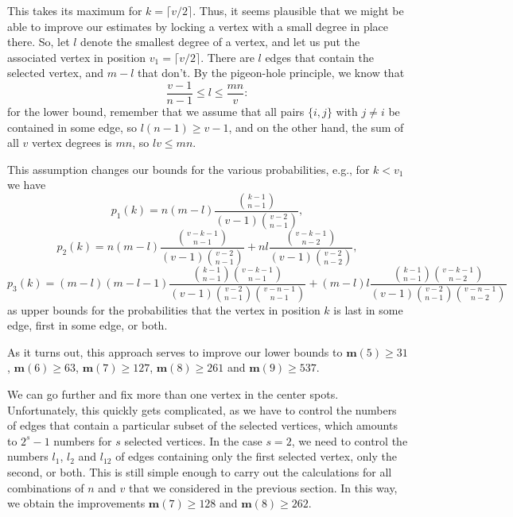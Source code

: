 \documentclass[a4paper,12pt]{article}
\begin{document}
This takes its maximum for $k=\lceil v/2\rceil$. Thus, it seems plausible
that we might be able to improve our estimates by locking a vertex with a
small degree in place there. So, let $l$ denote the smallest degree
of a vertex, and let us put the associated vertex in position
$v_1=\lceil v/2\rceil$. There are $l$ edges that contain the selected
vertex, and $m-l$ that don't. By the pigeon-hole principle, we know
that
\[\frac{v-1}{n-1}\le l\le \frac{mn}{v}:\]
for the lower bound, remember that we assume that all pairs $\{i,j\}$ with
$j\neq i$ be contained in some edge, so $l(n-1)\ge v-1$, and on the other
hand, the sum of all $v$ vertex degrees is $mn$, so $lv\le mn$.

This assumption changes our bounds for the various probabilities, e.g.,
for $k<v_1$ we have
\[p_1(k)=n(m-l)\frac{\genfrac(){0pt}1{k-1}{n-1}}
{(v-1)\genfrac(){0pt}1{v-2}{n-1}},\]
\[p_2(k)=n(m-l)\frac{\genfrac(){0pt}1{v-k-1}{n-1}}
{(v-1)\genfrac(){0pt}1{v-2}{n-1}}+
nl\frac{\genfrac(){0pt}1{v-k-1}{n-2}}
{(v-1)\genfrac(){0pt}1{v-2}{n-2}},\]
\[p_3(k)=(m-l)(m-l-1)\frac{
\genfrac(){0pt}1{k-1}{n-1}\genfrac(){0pt}1{v-k-1}{n-1}}
{(v-1)\genfrac(){0pt}1{v-2}{n-1}\genfrac(){0pt}1{v-n-1}{n-1}}+
(m-l)l\frac{
\genfrac(){0pt}1{k-1}{n-1}\genfrac(){0pt}1{v-k-1}{n-2}}
{(v-1)\genfrac(){0pt}1{v-2}{n-1}\genfrac(){0pt}1{v-n-1}{n-2}}\]
as upper bounds for the probabilities that the vertex in position $k$ is
last in some edge, first in some edge, or both.

As it turns out, this approach serves to improve our lower bounds to
$\mathbf m(5)\ge 31$, $\mathbf m(6)\ge 63$, $\mathbf m(7)\ge 127$, $\mathbf m(8)\ge 261$ and
$\mathbf m(9)\ge 537$.

We can go further and fix more than one vertex in the center spots.
 Unfortunately, this quickly gets complicated, as we have
to control the numbers of edges that contain a particular subset of the
selected vertices, which amounts to $2^s-1$ numbers for $s$ selected 
vertices. In the case $s=2$, we need to control the
numbers $l_1$, $l_2$ and $l_{12}$ of edges containing only the first
selected vertex, only the second, or both. This 
 is still simple enough to carry out the
calculations for all combinations of $n$ and $v$ that we considered 
in the previous section. 
In this way, we obtain the improvements
$\mathbf m(7)\ge 128$ and  $\mathbf m(8)\ge 262$.
\end{document}
